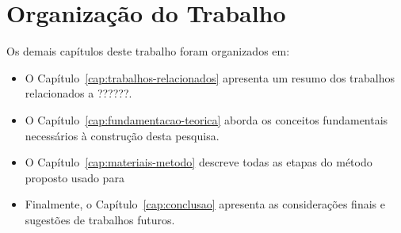 \section{Organização do Trabalho}
\label{sec:organizacao-do-trabalho}

Os demais capítulos deste trabalho foram organizados em:

\begin{itemize}
    \item O Capítulo~\ref{cap:trabalhos-relacionados} apresenta um resumo dos trabalhos relacionados a ??????.
    \item O Capítulo~\ref{cap:fundamentacao-teorica} aborda os conceitos fundamentais necessários à construção desta pesquisa.
    \item O Capítulo~\ref{cap:materiais-metodo} descreve todas as etapas do método proposto usado para 
    \item Finalmente, o Capítulo~\ref{cap:conclusao} apresenta as considerações finais e sugestões de trabalhos futuros.
\end{itemize}